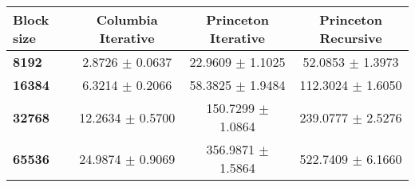 \begin{tabular}{lccc}\toprule
\textbf{Block size}  & \textbf{Columbia Iterative} & \textbf{Princeton Iterative} & \textbf{Princeton Recursive}\\\midrule
\textbf{8192}  & 2.8726 $\pm$ 0.0637 & 22.9609 $\pm$ 1.1025 & 52.0853 $\pm$ 1.3973\\
\textbf{16384}  & 6.3214 $\pm$ 0.2066 & 58.3825 $\pm$ 1.9484 & 112.3024 $\pm$ 1.6050\\
\textbf{32768}  & 12.2634 $\pm$ 0.5700 & 150.7299 $\pm$ 1.0864 & 239.0777 $\pm$ 2.5276\\
\textbf{65536} & 24.9874 $\pm$ 0.9069 & 356.9871 $\pm$ 1.5864 & 522.7409 $\pm$ 6.1660\\
\bottomrule
\end{tabular}
